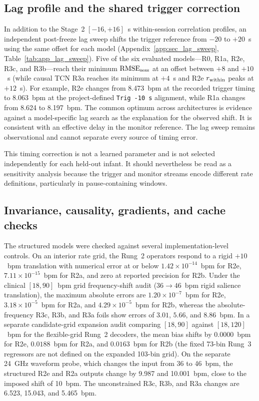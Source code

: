 \subsection{Lag profile and the shared trigger correction}
\label{sec:ch4_lag}

In addition to the Stage~2 $[-16,+16]$~s within-session correlation profiles, an independent
post-freeze lag sweep shifts the trigger reference from $-20$ to $+20$~s using the same offset
for each model (Appendix~\ref{app:sec_lag_sweep}, Table~\ref{tab:app_lag_sweep}). Five of the
six evaluated models---R0, R1a, R2e, R3c, and R3b---reach their minimum $\mathrm{RMSE}_{\mathrm{sess}}$ at an offset
between $+8$ and $+10$~s (while causal TCN R3a reaches its minimum at $+4$~s and R2e $r_{\mathrm{within}}$
peaks at $+12$~s). For example, R2e
changes from 8.473~bpm at the recorded trigger timing to 8.063~bpm at the project-defined
\texttt{Trig -10 s} alignment, while R1a changes from 8.624 to 8.197~bpm. The common optimum
across architectures is evidence against a model-specific lag search as the explanation for the
observed shift. It is consistent with an effective delay in the monitor reference. The lag
sweep remains observational and cannot separate every source of timing error.

This timing correction is not a learned parameter and is not selected independently for each
held-out infant. It should nevertheless be read as a sensitivity analysis because the trigger and
monitor streams encode different rate definitions, particularly in pause-containing windows.

\subsection{Invariance, causality, gradients, and cache checks}
\label{sec:ch4_implementation_checks}

The structured models were checked against several implementation-level controls. On an
interior rate grid, the Rung~2 operators respond to a rigid $+10$~bpm translation with
numerical error at or below $1.42\times10^{-14}$~bpm for R2e, $7.11\times10^{-15}$~bpm for
R2a, and zero at reported precision for R2b. Under the clinical $[18,90]$~bpm grid
frequency-shift audit ($36\to46$~bpm rigid salience translation), the maximum absolute errors
are $1.20\times10^{-7}$~bpm for R2e, $3.18\times10^{-5}$~bpm for R2a, and
$4.29\times10^{-5}$~bpm for R2b, whereas the absolute-frequency R3c, R3b, and R3a foils show
errors of $3.01$, $5.66$, and $8.86$~bpm. In a separate candidate-grid expansion audit comparing
$[18,90]$ against $[18,120]$~bpm for the flexible-grid Rung~2 decoders, the mean bias shifts
by $0.0000$~bpm for R2e, $0.0188$~bpm for R2a, and $0.0163$~bpm for R2b (the fixed 73-bin
Rung~3 regressors are not defined on the expanded 103-bin grid). On the separate 24~GHz
waveform probe, which changes the input from 36 to 46~bpm, the structured R2e and R2a outputs
change by 9.987 and 10.001~bpm, close to the imposed shift of 10~bpm. The unconstrained R3c,
R3b, and R3a changes are 6.523, 15.043, and 5.465~bpm.

